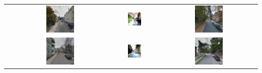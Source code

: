 \begin{table}
\begin{tabular}{l*3{C}@{}}
		& \includegraphics[width=0.3\textwidth]{Plot/examples/u_4} & \includegraphics[width=0.3\textwidth]{Plot/examples/t_4} &  \includegraphics[width=0.3\textwidth]{Plot/examples/b_4} \\ 
		& \includegraphics[width=0.3\textwidth]{Plot/examples/u_5} & \includegraphics[width=0.3\textwidth]{Plot/examples/t_5} &  \includegraphics[width=0.3\textwidth]{Plot/examples/b_5} \\ 

\end{tabular}
\end{table}
